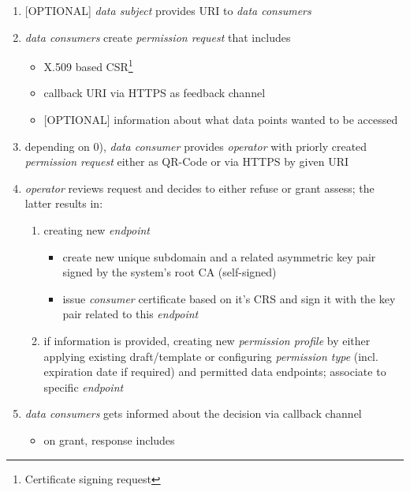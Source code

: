 \documentclass[12pt,english,a4paper,titlepage,cleardoublepage=empty,dottedtoc]{report}
\providecommand{\tightlist}{%
  \setlength{\itemsep}{0pt}\setlength{\parskip}{0pt}}
\begin{document}
\begin{enumerate}
\def\labelenumi{\arabic{enumi})}
\setcounter{enumi}{-1}
\item
  {[}OPTIONAL{]} \emph{data subject} provides URI to \emph{data
  consumers}
\item
  \emph{data consumers} create \emph{permission request} that includes

  \begin{itemize}
  \tightlist
  \item
    X.509 based CSR\footnote{Certificate signing request}
  \item
    callback URI via HTTPS as feedback channel
  \item
    {[}OPTIONAL{]} information about what data points wanted to be
    accessed
  \end{itemize}
\item
  depending on 0), \emph{data consumer} provides \emph{operator} with
  priorly created \emph{permission request} either as QR-Code or via
  HTTPS by given URI
\item
  \emph{operator} reviews request and decides to either refuse or grant
  assess; the latter results in:

  \begin{enumerate}
  \def\labelenumii{\alph{enumii})}
  \tightlist
  \item
    creating new \emph{endpoint}

    \begin{itemize}
    \tightlist
    \item
      create new unique subdomain and a related asymmetric key pair
      signed by the system's root CA (self-signed)
    \item
      issue \emph{consumer} certificate based on it's CRS and sign it
      with the key pair related to this \emph{endpoint}
    \end{itemize}
  \item
    if information is provided, creating new \emph{permission profile}
    by either applying existing draft/template or configuring
    \emph{permission type} (incl. expiration date if required) and
    permitted data endpoints; associate to specific \emph{endpoint}
  \end{enumerate}
\item
  \emph{data consumers} gets informed about the decision via callback
  channel

  \begin{itemize}
  \tightlist
  \item
    on grant, response includes


\end{itemize}
\end{enumerate}
\end{document}
